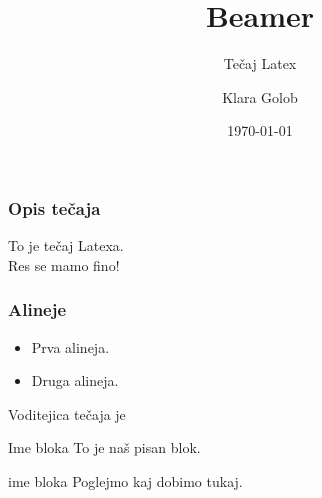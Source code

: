\documentclass{beamer}
\title{Beamer}
\subtitle{Tečaj Latex}
\author{Klara Golob}
\institute{Zoom}
\date{\today}
\begin{document}
\frame{\titlepage}


\begin{frame}
\frametitle{Opis tečaja}
To je tečaj Latexa. \pause
\\
Res se mamo fino!

\end{frame}

\begin{frame}

\frametitle{Alineje}

\begin{itemize}
\item <1-> Prva alineja.
\item <2-> Druga alineja.
\end{itemize}


\end{frame}

\begin{frame}
Voditejica tečaja je 
\

\end{frame}


\begin{frame}


\begin{block}{Ime bloka}
To je naš pisan blok.
\end{block}

\begin{alertblock}{ime bloka}
Poglejmo kaj dobimo tukaj.
\end{alertblock}

\end{frame}


\begin{frame}




\end{frame}
\end{document}
